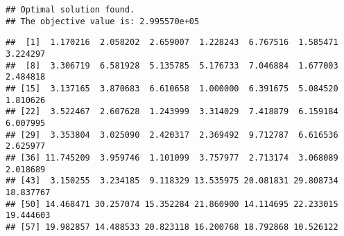 \documentclass[
]{article}
\newenvironment{Shaded}{\begin{snugshade}}{\end{snugshade}}
\newcommand{\CommentTok}[1]{\textcolor[rgb]{0.56,0.35,0.01}{\textit{#1}}}
\newcommand{\DataTypeTok}[1]{\textcolor[rgb]{0.13,0.29,0.53}{#1}}
\newcommand{\DecValTok}[1]{\textcolor[rgb]{0.00,0.00,0.81}{#1}}
\newcommand{\KeywordTok}[1]{\textcolor[rgb]{0.13,0.29,0.53}{\textbf{#1}}}
\newcommand{\NormalTok}[1]{#1}
\newcommand{\OperatorTok}[1]{\textcolor[rgb]{0.81,0.36,0.00}{\textbf{#1}}}
\newcommand{\StringTok}[1]{\textcolor[rgb]{0.31,0.60,0.02}{#1}}
\begin{document}
\begin{Shaded}
\end{Shaded}

\begin{verbatim}
## Optimal solution found.
## The objective value is: 2.995570e+05
\end{verbatim}

\begin{Shaded}
\end{Shaded}

\begin{verbatim}
##  [1]  1.170216  2.058202  2.659007  1.228243  6.767516  1.585471  3.224297
##  [8]  3.306719  6.581928  5.135785  5.176733  7.046884  1.677003  2.484818
## [15]  3.137165  3.870683  6.610658  1.000000  6.391675  5.084520  1.810626
## [22]  3.522467  2.607628  1.243999  3.314029  7.418879  6.159184  6.007995
## [29]  3.353804  3.025090  2.420317  2.369492  9.712787  6.616536  2.625977
## [36] 11.745209  3.959746  1.101099  3.757977  2.713174  3.068089  2.018689
## [43]  3.150255  3.234185  9.118329 13.535975 20.081831 29.808734 18.837767
## [50] 14.468471 30.257074 15.352284 21.860900 14.114695 22.233015 19.444603
## [57] 19.982857 14.488533 20.823118 16.200768 18.792868 10.526122
\end{verbatim}
\end{document}
